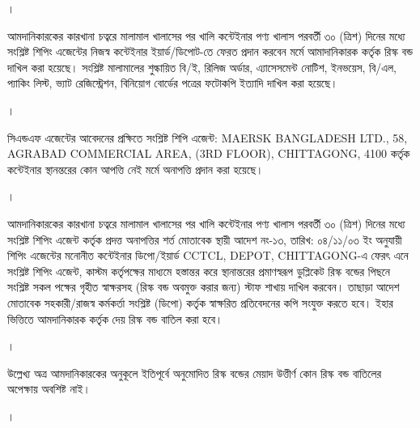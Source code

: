 \documentclass[12pt]{article}
\newcommand{\rdepo}{CCTCL, DEPOT, CHITTAGONG}
\newcommand{\san}{MAERSK BANGLADESH LTD.}
\newcommand{\sad}{58, AGRABAD COMMERCIAL AREA, (3RD FLOOR), CHITTAGONG, 4100}
\begin{document}
\begin{minipage}[t]{0.04\linewidth}
।
\end{minipage}
\begin{minipage}[t]{0.96\linewidth}
আমদানিকারকের কারখানা চত্বরে মালামাল
খালাসের পর খালি কন্টেইনার পণ্য খালাস
পরবর্তী ৩০ (ত্রিশ) দিনের মধ্যে
সংশ্লিষ্ট শিপিং এজেন্টের নিজস্ব কন্টেইনার
ইয়ার্ড/ডিপোট-তে ফেরত প্রদান করবেন
মর্মে আমাদানিকারক কর্তৃক রিস্ক বন্ড দাখিল
করা হয়েছে।
সংশ্লিষ্ট মালামালের শুল্কায়িত বি/ই,
রিলিজ অর্ডার, এ্যাসেসমেন্ট নোটিশ,
ইনভয়েস, বি/এল, প্যাকিং লিস্ট,
ভ্যাট রেজিস্ট্রেশন, বিনিয়োগ বোর্ডের
পত্রের ফটোকপি ইত্যাদি দাখিল করা হয়েছে।
\\
\end{minipage}
\begin{minipage}[t]{0.04\linewidth}
।
\end{minipage}
\begin{minipage}[t]{0.96\linewidth}
সিএন্ডএফ এজেন্টের আবেদনের প্রক্ষিতে
সংশ্লিষ্ট শিপি এজেন্ট:
{\san}, {\sad}
কর্তৃক কন্টেইনার স্থানন্তরের কোন আপত্তি নেই
মর্মে অনাপত্তি প্রদান করা হয়েছে।
\\
\end{minipage}
\begin{minipage}[t]{0.04\linewidth}
।
\end{minipage}
\begin{minipage}[t]{0.96\linewidth}
আমদানিকারকের কারখানা চত্বরে মালামাল
খালাসের পর খালি কন্টেইনার পণ্য খালাস পরবর্তী
৩০ (ত্রিশ) দিনের মধ্যে
সংশ্লিষ্ট শিপিং এজেন্ট কর্তৃক প্রদত্ত
অনাপত্তির শর্ত মোতাবেক
স্থায়ী আদেশ নং-১৩,
তারিখ: ০৪/১১/০৩ ইং
অনুযায়ী শিপিং এজেন্টের মনোনীত
কন্টেইনার ডিপো/ইয়ার্ড {\rdepo}-এ
ফেরৎ এনে সংশ্লিষ্ট শিপিং এজেন্ট,
কাস্টম কর্তৃপক্ষের মাধ্যমে হস্তান্তর করে
স্থানান্তরের প্রমাণস্বরূপ ডুপ্লিকেট রিস্ক বন্ডের পিছনে
সংশ্লিষ্ট সকল পক্ষের গৃহীত স্বাক্ষরসহ
(রিস্ক বন্ড অবমুক্ত করার জন্য)
স্টাফ শাখায় দাখিল করবেন।
তাছাড়া আদেশ মোতাবেক
সহকারী/রাজস্ব কর্মকর্তা সংশ্লিষ্ট (ডিপো) কর্তৃক
স্বাক্ষরিত প্রতিবেদনের কপি সংযুক্ত করতে হবে।
ইহার ভিত্তিতে আমদানিকারক কর্তৃক দেয়
রিস্ক বন্ড বাতিল করা হবে।
\\
\end{minipage}
\begin{minipage}[t]{0.04\linewidth}
।
\end{minipage}
\begin{minipage}[t]{0.96\linewidth}
উল্লেখ্য অত্র আমদানিকারকের অনুকূলে ইতিপূর্বে
অনুমোদিত রিস্ক বন্ডের মেয়াদ উত্তীর্ণ কোন
রিস্ক বন্ড বাতিলের অপেক্ষায় অবশিষ্ট নাই।
\\
\end{minipage}
\begin{minipage}[t]{0.04\linewidth}
।
\end{minipage}
\end{document}
